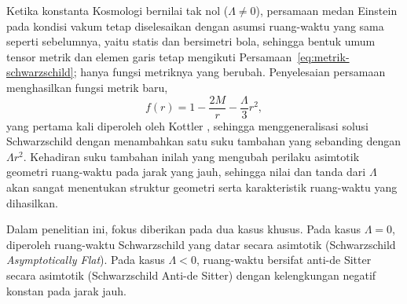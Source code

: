 Ketika konstanta Kosmologi bernilai tak nol ($\Lambda \neq 0$), persamaan medan Einstein 
pada kondisi vakum tetap diselesaikan dengan asumsi ruang-waktu yang sama seperti sebelumnya, 
yaitu statis dan bersimetri bola, sehingga bentuk umum tensor metrik dan elemen garis tetap 
mengikuti Persamaan~\eqref{eq:metrik-schwarzschild}; hanya fungsi metriknya yang berubah. 
Penyelesaian persamaan menghasilkan fungsi metrik baru,
\begin{equation}
    f(r) = 1 - \frac{2M}{r} - \frac{\Lambda}{3} r^2,
    \label{eq:fungsi-metrik-umum}
\end{equation}
yang pertama kali diperoleh oleh Kottler \parencite{Kottler1918}, sehingga menggeneralisasi 
solusi Schwarzschild dengan menambahkan satu suku tambahan yang sebanding dengan $\Lambda r^2$. 
Kehadiran suku tambahan inilah yang mengubah perilaku asimtotik geometri ruang-waktu pada 
jarak yang jauh, sehingga nilai dan tanda dari $\Lambda$ akan sangat menentukan struktur 
geometri serta karakteristik ruang-waktu yang dihasilkan.

Dalam penelitian ini, fokus diberikan pada dua kasus khusus. Pada kasus $\Lambda = 0$, 
diperoleh ruang-waktu Schwarzschild yang datar secara asimtotik (Schwarzschild 
\textit{Asymptotically Flat}). Pada kasus $\Lambda < 0$, ruang-waktu bersifat anti-de Sitter 
secara asimtotik (Schwarzschild Anti-de Sitter) dengan kelengkungan negatif konstan pada 
jarak jauh.